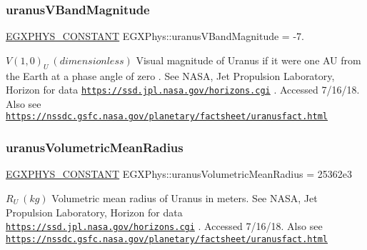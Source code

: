 \subsubsection{\texorpdfstring{uranus\+V\+Band\+Magnitude}{uranusVBandMagnitude}}
{\footnotesize\ttfamily \mbox{\hyperlink{group___e_g_x_phys-_constants-_macros_ga76980d288494ce1714c9ac68a95ba702}{E\+G\+X\+P\+H\+Y\+S\+\_\+\+C\+O\+N\+S\+T\+A\+NT}} E\+G\+X\+Phys\+::uranus\+V\+Band\+Magnitude = -\/7.}

$ V(1,0)_{U} \ (dimensionless)$ Visual magnitude of Uranus if it were one AU from the Earth at a phase angle of zero . See N\+A\+SA, Jet Propulsion Laboratory, Horizon for data \href{https://ssd.jpl.nasa.gov/horizons.cgi}{\tt https\+://ssd.\+jpl.\+nasa.\+gov/horizons.\+cgi} . Accessed 7/16/18. Also see \href{https://nssdc.gsfc.nasa.gov/planetary/factsheet/uranusfact.html}{\tt https\+://nssdc.\+gsfc.\+nasa.\+gov/planetary/factsheet/uranusfact.\+html} \mbox{\label{group___e_g_x_phys-_constants-_astrophysics-_solar_system-_uranus-_bulk_gae20d0e7177a2cc5b86297f1ab2cf8400}} 
\subsubsection{\texorpdfstring{uranus\+Volumetric\+Mean\+Radius}{uranusVolumetricMeanRadius}}
{\footnotesize\ttfamily \mbox{\hyperlink{group___e_g_x_phys-_constants-_macros_ga76980d288494ce1714c9ac68a95ba702}{E\+G\+X\+P\+H\+Y\+S\+\_\+\+C\+O\+N\+S\+T\+A\+NT}} E\+G\+X\+Phys\+::uranus\+Volumetric\+Mean\+Radius = 25362e3}

$R_{U} \ (kg)$ Volumetric mean radius of Uranus in meters. See N\+A\+SA, Jet Propulsion Laboratory, Horizon for data \href{https://ssd.jpl.nasa.gov/horizons.cgi}{\tt https\+://ssd.\+jpl.\+nasa.\+gov/horizons.\+cgi} . Accessed 7/16/18. Also see \href{https://nssdc.gsfc.nasa.gov/planetary/factsheet/uranusfact.html}{\tt https\+://nssdc.\+gsfc.\+nasa.\+gov/planetary/factsheet/uranusfact.\+html} 